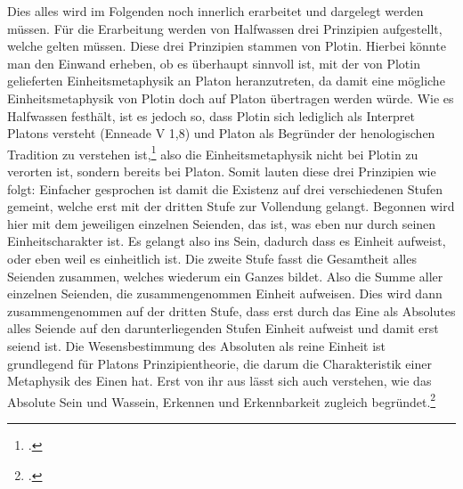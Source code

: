Dies alles wird im Folgenden noch innerlich erarbeitet und dargelegt werden müssen.
Für die Erarbeitung werden von Halfwassen drei Prinzipien aufgestellt, welche gelten müssen.
Diese drei Prinzipien stammen von Plotin. Hierbei könnte man den Einwand erheben, ob es überhaupt sinnvoll ist, mit der von Plotin gelieferten Einheitsmetaphysik an Platon heranzutreten, da damit eine mögliche Einheitsmetaphysik von Plotin doch auf Platon übertragen werden würde. Wie es Halfwassen festhält, ist es jedoch so, dass Plotin sich lediglich als Interpret Platons versteht (Enneade V 1,8) und Platon als Begründer der henologischen Tradition zu verstehen ist,\footcite[vgl.][S. 92]{halfwassen2015spuren} also die Einheitsmetaphysik nicht bei Plotin zu verorten ist, sondern bereits bei Platon.
Somit lauten diese drei Prinzipien wie folgt:
Einfacher gesprochen ist damit die Existenz auf drei verschiedenen Stufen gemeint, welche erst mit der dritten Stufe zur Vollendung gelangt. Begonnen wird hier mit dem jeweiligen einzelnen Seienden, das ist, was eben nur durch seinen Einheitscharakter ist. Es gelangt also ins Sein, dadurch dass es Einheit aufweist, oder eben weil es einheitlich ist. Die zweite Stufe fasst die Gesamtheit alles Seienden zusammen, welches wiederum ein Ganzes bildet. Also die Summe aller einzelnen Seienden, die zusammengenommen Einheit aufweisen. Dies wird dann zusammengenommen auf der dritten Stufe, dass erst durch das Eine als Absolutes alles Seiende auf den darunterliegenden Stufen Einheit aufweist und damit erst seiend ist. 
Die Wesensbestimmung des Absoluten als reine Einheit ist grundlegend für Platons Prinzipientheorie, die darum die Charakteristik einer Metaphysik des Einen hat. Erst von ihr aus lässt sich auch verstehen, wie das Absolute Sein und Wassein, Erkennen und Erkennbarkeit zugleich begründet.\footcite[vgl.][S. 96]{halfwassen2015spuren}
